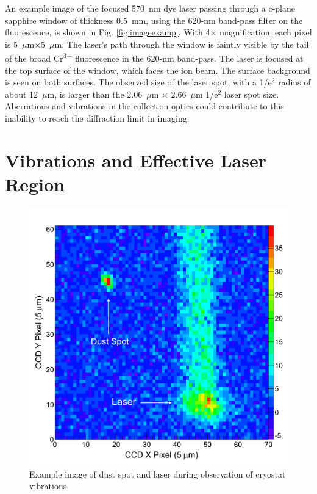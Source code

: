 An example image of the focused 570~nm dye laser passing through a c-plane sapphire window of thickness 0.5~mm, using the 620-nm band-pass filter on the fluorescence, is shown in Fig. \ref{fig:imageexamp}.  With 4$\times$ magnification, each pixel is 5~$\mu$m$\times$5~$\mu$m.  The laser's path through the window is faintly visible by the tail of the broad Cr\textsuperscript{3+} fluorescence in the 620-nm band-pass.  The laser is focused at the top surface of the window, which faces the ion beam.  The surface background is seen on both surfaces.  The observed size of the laser spot, with a 1/e$^{2}$ radius of about 12~$\mu$m, is larger than the 2.06~$\mu$m $\times$ 2.66~$\mu$m 1/e$^{2}$ laser spot size.  Aberrations and vibrations in the collection optics could contribute to this inability to reach the diffraction limit in imaging.


\section{Vibrations and Effective Laser Region}

\begin{figure} %
        \centering
                \includegraphics[width=.6\textwidth]{figures/image_dustspot.png}
                \caption{Example image of dust spot and laser during observation of cryostat vibrations.}
\label{fig:dustspot}
\end{figure}

